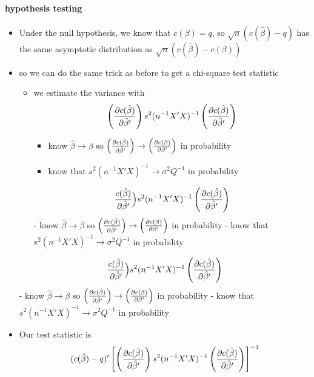 \paragraph{hypothesis testing}
\label{sec-3-2-3}

\begin{itemize}
\item Under the null hypothesis, we know that $c(\beta) = q$, so
        $\sqrt{n}(c(\hat\beta) - q)$ has the same asymptotic
        distribution as $\sqrt{n}(c(\hat\beta) - c(\beta))$
\item so we can do the same trick as before to get a chi-square test
        statistic
\begin{itemize}
\item we estimate the variance with \[ \left({\partial
        c(\hat\beta) \over \partial \hat\beta'}\right)s^2 (n^{-1}X'X)^{-1}
        \left({\partial c(\hat\beta) \over \partial \hat\beta'}\right)\]
\begin{itemize}
\item know $\hat\beta \to \beta$ so $\left({\partial c(\hat\beta)
            \over \partial \hat\beta'}\right) \to \left({\partial
            c(\beta) \over \partial \beta'}\right)$ in probability
\item know that $s^2 (n^{-1} X'X)^{-1} \to \sigma^2Q^{-1}$ in
            probability
\end{itemize}
\[{c(\hat\beta) \over \partial \hat\beta'}\Big)s^2 (n^{-1}X'X)^{-1}
        \left({\partial c(\hat\beta) \over \partial \hat\beta'}\right)\]
          - know $\hat\beta \to \beta$ so $\left({\partial c(\hat\beta)
            \over \partial \hat\beta'}\right) \to \left({\partial
            c(\beta) \over \partial \beta'}\right)$ in probability
          - know that $s^2 (n^{-1} X'X)^{-1} \to \sigma^2Q^{-1}$ in
            probability
\end{itemize}
\[{c(\hat\beta) \over \partial \hat\beta'}\Big)s^2 (n^{-1}X'X)^{-1}
        \left({\partial c(\hat\beta) \over \partial \hat\beta'}\right)\]
          - know $\hat\beta \to \beta$ so $\left({\partial c(\hat\beta)
            \over \partial \hat\beta'}\right) \to \left({\partial
            c(\beta) \over \partial \beta'}\right)$ in probability
          - know that $s^2 (n^{-1} X'X)^{-1} \to \sigma^2Q^{-1}$ in
            probability
\item Our test statistic is 
        \[ (c(\hat\beta) - q)' \left[\left({\partial
        c(\hat\beta) \over \partial \hat\beta'}\right)s^2 (n^{-1}X'X)^{-1}
        \left({\partial c(\hat\beta) \over \partial \hat\beta'}\right) \right]^{-1}
\]
\end{itemize}

